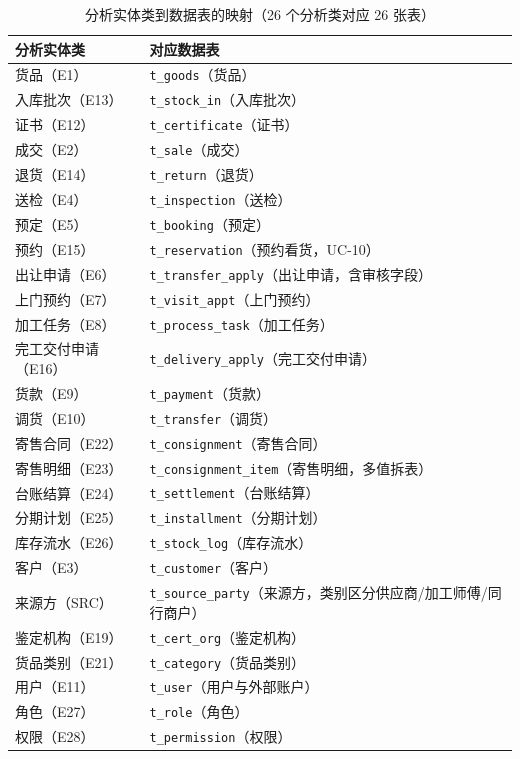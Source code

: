 \documentclass[12pt, a4paper]{ctexart}
\newcommand{\code}[1]{\texttt{\small #1}}
\begin{document}
\begin{table}[H]
\centering
\small
\caption{分析实体类到数据表的映射（26 个分析类对应 26 张表）}
\label{tab:class-table}
\begin{tabularx}{\textwidth}{@{}l X@{}}
\toprule
分析实体类 & 对应数据表 \\
\midrule
货品（E1） & \code{t\_goods}（货品） \\
入库批次（E13） & \code{t\_stock\_in}（入库批次） \\
证书（E12） & \code{t\_certificate}（证书） \\
成交（E2） & \code{t\_sale}（成交） \\
退货（E14） & \code{t\_return}（退货） \\
送检（E4） & \code{t\_inspection}（送检） \\
预定（E5） & \code{t\_booking}（预定） \\
预约（E15） & \code{t\_reservation}（预约看货，UC-10） \\
出让申请（E6） & \code{t\_transfer\_apply}（出让申请，含审核字段） \\
上门预约（E7） & \code{t\_visit\_appt}（上门预约） \\
加工任务（E8） & \code{t\_process\_task}（加工任务） \\
完工交付申请（E16） & \code{t\_delivery\_apply}（完工交付申请） \\
货款（E9） & \code{t\_payment}（货款） \\
调货（E10） & \code{t\_transfer}（调货） \\
寄售合同（E22） & \code{t\_consignment}（寄售合同） \\
寄售明细（E23） & \code{t\_consignment\_item}（寄售明细，多值拆表） \\
台账结算（E24） & \code{t\_settlement}（台账结算） \\
分期计划（E25） & \code{t\_installment}（分期计划） \\
库存流水（E26） & \code{t\_stock\_log}（库存流水） \\
客户（E3） & \code{t\_customer}（客户） \\
来源方（SRC） & \code{t\_source\_party}（来源方，类别区分供应商/加工师傅/同行商户） \\
鉴定机构（E19） & \code{t\_cert\_org}（鉴定机构） \\
货品类别（E21） & \code{t\_category}（货品类别） \\
用户（E11） & \code{t\_user}（用户与外部账户） \\
角色（E27） & \code{t\_role}（角色） \\
权限（E28） & \code{t\_permission}（权限） \\
\bottomrule
\end{tabularx}
\end{table}
\end{document}
